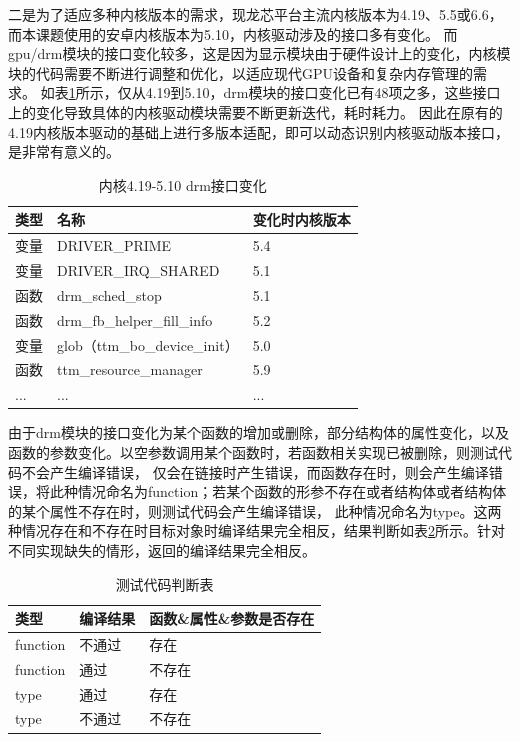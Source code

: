 二是为了适应多种内核版本的需求，现龙芯平台主流内核版本为4.19、5.5或6.6，而本课题使用的安卓内核版本为5.10，内核驱动涉及的接口多有变化。
而gpu/drm模块的接口变化较多，这是因为显示模块由于硬件设计上的变化，内核模块的代码需要不断进行调整和优化，以适应现代GPU设备和复杂内存管理的需求。
如表\ref{tab:内核4.19-5.10 drm接口变化}所示，仅从4.19到5.10，drm模块的接口变化已有48项之多，这些接口上的变化导致具体的内核驱动模块需要不断更新迭代，耗时耗力。
因此在原有的4.19内核版本驱动的基础上进行多版本适配，即可以动态识别内核驱动版本接口，是非常有意义的。

\begin{table}[h]
  \centering
  \caption{内核4.19-5.10 drm接口变化}
  \label{tab:内核4.19-5.10 drm接口变化}
  \begin{tabular}{lll}
    \toprule
    类型   &   名称  &变化时内核版本  \\
    \midrule
    变量 & DRIVER\_PRIME & 5.4 \\
    变量 & DRIVER\_IRQ\_SHARED & 5.1 \\
    函数 & drm\_sched\_stop & 5.1 \\
    函数 & drm\_fb\_helper\_fill\_info & 5.2 \\
    变量 & glob（ttm\_bo\_device\_init） & 5.0 \\
    函数 & ttm\_resource\_manager & 5.9 \\
    ... & ... & ... \\
    \bottomrule
  \end{tabular}
\end{table}

由于drm模块的接口变化为某个函数的增加或删除，部分结构体的属性变化，以及函数的参数变化。以空参数调用某个函数时，若函数相关实现已被删除，则测试代码不会产生编译错误，
仅会在链接时产生错误，而函数存在时，则会产生编译错误，将此种情况命名为function；若某个函数的形参不存在或者结构体或者结构体的某个属性不存在时，则测试代码会产生编译错误，
此种情况命名为type。这两种情况存在和不存在时目标对象时编译结果完全相反，结果判断如表\ref{tab:测试代码判断表}所示。针对不同实现缺失的情形，返回的编译结果完全相反。

\begin{table}[h]
  \centering
  \caption{测试代码判断表}
  \label{tab:测试代码判断表}
  \begin{tabular}{lll}
    \toprule
    类型   &   编译结果 & 函数\&属性\&参数是否存在    \\
    \midrule
    function & 不通过 & 存在 \\
    function & 通过 & 不存在 \\
    type & 通过 & 存在 \\
    type & 不通过 & 不存在 \\
    \bottomrule
  \end{tabular}
\end{table}

